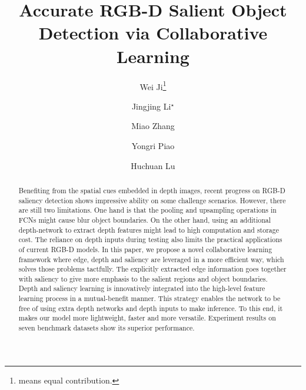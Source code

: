 \documentclass[runningheads]{llncs}
\begin{document}
\pagestyle{headings}
\mainmatter
\def\ECCVSubNumber{2916}  

\title{Accurate RGB-D Salient Object Detection via Collaborative Learning} 

\begin{comment}
\titlerunning{Accurate RGB-D Salient Object Detection via Collaborative Learning} 
\authorrunning{ECCV-20 submission ID \ECCVSubNumber} 
\author{ }
\institute{$^1$Dalian University of Technology, China\\$^2$Pengcheng Lab}
\end{comment}


\author{Wei Ji\thanks{means equal contribution.}\and
Jingjing Li$^\star$\and
Miao Zhang\textsuperscript{\Letter} \and
Yongri Piao\and
Huchuan Lu}
\maketitle

\begin{abstract}
Benefiting from the spatial cues embedded in depth images, recent progress on RGB-D saliency detection shows impressive ability on some challenge scenarios.
However, there are still two limitations.
One hand is that the pooling and upsampling operations in FCNs might cause blur object boundaries.
On the other hand, using an additional depth-network to extract depth features might lead to high computation and storage cost.
The reliance on depth inputs during testing also limits the practical applications of current RGB-D models. 
In this paper, we propose a novel collaborative learning framework where edge, depth and saliency are leveraged in a more efficient way, which solves those problems tactfully.
The explicitly extracted edge information goes together with saliency to give more emphasis to the salient regions and object boundaries.
Depth and saliency learning is innovatively integrated into the high-level feature learning process in a mutual-benefit manner.
This strategy enables the network to be free of using extra depth networks and depth inputs to make inference.
To this end, it makes our model more lightweight, faster and more versatile.
Experiment results on seven benchmark datasets show its superior performance.
\end{abstract}
\end{document}
